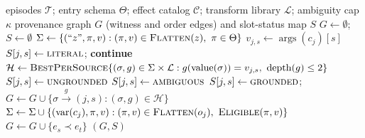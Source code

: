 \begin{algorithm}[t]
\caption{\textsc{BuildPatg} --- typed argument provenance. \patg annotates every
argument slot and blocks nothing itself; \textsc{MineRegions} (\cref{alg:compile})
rejects any window containing an \textsc{ungrounded} or \textsc{ambiguous} slot,
so a slot with no witness (unresolved in the bounded library) and a slot with too many
witnesses both retire the region rather than defaulting to the cheapest
explanation.}
\label{alg:patg}
\footnotesize
\begin{algorithmic}[1]
\Require episodes $\mathcal{T}$; entry schema $\Theta$; effect catalog $\mathcal{C}$;
         transform library $\mathcal{L}$; ambiguity cap $\kappa$
\Ensure provenance graph $G$ (witness and order edges) and slot-status map $S$
\State $G\gets\emptyset$;\quad $S\gets\emptyset$
  \State $\Sigma\gets\{(\text{``}z\text{''},\pi,v):(\pi,v)\in\textsc{Flatten}(z),\ \pi\in\Theta\}$
      \State $v_{j,s}\gets\operatorname{args}(c_j)[s]$ 
        \State $S[j,s]\gets\textsc{literal}$; \textbf{continue}
      \EndIf
      \State $\mathcal{H}\gets\textsc{BestPerSource}\{(\sigma,g)\in\Sigma\times\mathcal{L}:
             g(\operatorname{value}(\sigma))=v_{j,s},\ \operatorname{depth}(g)\le 2\}$
        \State $S[j,s]\gets\textsc{ungrounded}$ 
        \State $S[j,s]\gets\textsc{ambiguous}$
      \Else
        \State $S[j,s]\gets\textsc{grounded}$;\quad
               $G\gets G\cup\{\sigma\xrightarrow{\,g\,}(j,s):(\sigma,g)\in\mathcal{H}\}$
      \EndIf
    \EndFor
    \State $\Sigma\gets\Sigma\cup\{(\operatorname{var}(c_j),\pi,v):
           (\pi,v)\in\textsc{Flatten}(o_j),\ \textsc{Eligible}(\pi,v)\}$
  \EndFor
    \State $G\gets G\cup\{e_s\prec e_t\}$ 
  \EndFor
\EndFor
\State \Return $(G,S)$
\end{algorithmic}
\end{algorithm}
